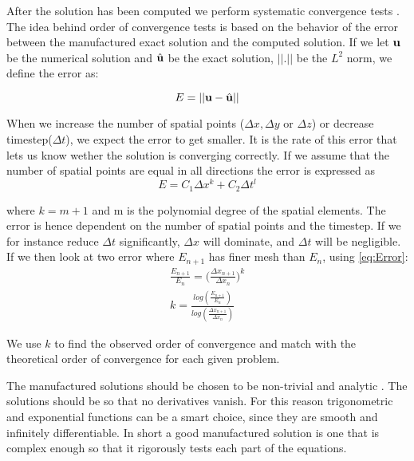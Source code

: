 After the solution has been computed we perform systematic convergence tests \cite{Roache}. The idea behind order of convergence tests is based on the behavior of the error between the manufactured exact solution and the computed solution. 
If we let $\bold{u}$ be the numerical solution and $\hat{\bold{u}}$ be the exact solution, $|| . ||$ be the $L^2$ norm, we define the error as:

\begin{equation}
E = || \bold{u} - \hat{\bold{u}} ||
\end{equation}

When we increase the number of spatial points ($ \Delta x, \Delta y$ or $ \Delta z$) or decrease timestep($\Delta t$), we expect the error to get smaller. It is the rate of this error that lets us know wether the solution is converging correctly.
If we assume that the number of spatial points are equal in all directions the error is expressed as
\begin{equation}
\label{eq:Error}
 E = C_1 \Delta x^k+ C_2 \Delta t^l 
\end{equation}

where $ k = m+1 $ and m is the polynomial degree of the spatial elements. The error is hence dependent on the number of spatial points and the timestep.
If we for instance reduce $\Delta t$ significantly, $\Delta x$ will dominate, and $\Delta t$ will be negligible. If we then look at two error where $E_{n+1}$ has finer mesh than $E_n$, using \eqref{eq:Error}:
\begin{align}
\frac{E_{n+1}}{E_n} = \big( \frac{\Delta x_{n+1}}{\Delta x_n} \big)^k \\
k = \frac{log( \frac{E_{n+1}}{E_n}) }{ log(\frac{\Delta x_{n+1}}{\Delta x_n})}
\end{align}

We use $k$ to find the observed order of convergence and match with the theoretical order of convergence for each given problem.\newline

The manufactured solutions should be chosen to be non-trivial and analytic \cite{Roache2002} \cite{Oberkampf2010}. The solutions should be so that no derivatives vanish. For this reason trigonometric and exponential functions can be a smart choice, since they are smooth and infinitely differentiable. In short a good manufactured solution is one that is complex enough so that it rigorously tests each part of the equations.\newline 

